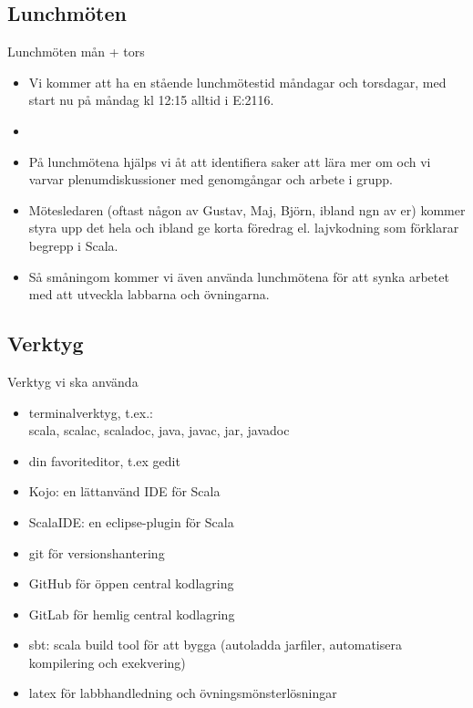 \documentclass{slides}
\begin{document}
\subsection{Lunchmöten}
\begin{Slide}{Lunchmöten mån + tors}
\begin{itemize}
\item Vi kommer att ha en stående lunchmötestid måndagar och torsdagar, med start nu på måndag kl 12:15 alltid i E:2116. 
\item {}

\item På lunchmötena hjälps vi åt att identifiera saker att lära mer om och vi varvar plenumdiskussioner med genomgångar och arbete i grupp. 

\item Mötesledaren (oftast någon av Gustav, Maj, Björn, ibland ngn av er) kommer styra upp det hela och ibland ge korta föredrag el. lajvkodning som förklarar begrepp i Scala. 

\item Så småningom kommer vi även använda lunchmötena för att synka arbetet med att utveckla labbarna och  övningarna.
\end{itemize}
\end{Slide}

\subsection{Verktyg}
\begin{Slide}{Verktyg vi ska använda}
\begin{itemize}
\item terminalverktyg, t.ex.:\\ scala, scalac, scaladoc, java, javac, jar, javadoc 
\item din favoriteditor, t.ex gedit
\item Kojo: en lättanvänd IDE för Scala \url{}
\item ScalaIDE: en eclipse-plugin för Scala \url{}
\item git för versionshantering \url{}
\item GitHub för öppen central kodlagring \url{}
\item GitLab för hemlig central kodlagring \url{}
\item sbt: scala build tool för att bygga (autoladda jarfiler, automatisera kompilering och exekvering) \url{}
\item latex för labbhandledning och övningsmönsterlösningar \url{}
\end{itemize} 
\pause
{}
\end{Slide}
\end{document}
